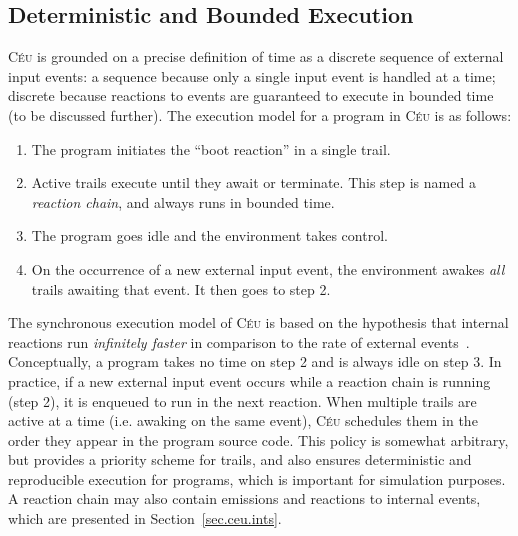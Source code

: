 \documentclass[letterpaper]{sig-alternate}
\newcommand{\CEU}{\textsc{C\'{e}u}\xspace}
\begin{document}
\subsection{Deterministic and Bounded Execution}
\label{sec.ceu.det}


\CEU is grounded on a precise definition of time as a discrete sequence of 
external input events:
a sequence because only a single input event is handled at a time; discrete 
because reactions to events are guaranteed to execute in bounded time (to be 
discussed further).
The execution model for a program in \CEU is as follows:

\begin{enumerate}
\item The program initiates the ``boot reaction'' in a single trail.
\item Active trails execute until they await or terminate.
      This step is named a \emph{reaction chain}, and always runs in bounded 
      time.
\item The program goes idle and the environment takes control.
\item On the occurrence of a new external input event, the environment awakes 
      \emph{all} trails awaiting that event.
      It then goes to step 2.
\end{enumerate}

The synchronous execution model of \CEU is based on the hypothesis that 
internal reactions run \emph{infinitely faster} in comparison to the rate of 
external events~\cite{rp.hypothesis}.
Conceptually, a program takes no time on step 2 and is always idle on step 3.
In practice, if a new external input event occurs while a reaction chain is 
running (step 2), it is enqueued to run in the next reaction.
%
%
When multiple trails are active at a time (i.e. awaking on the same event), 
\CEU schedules them in the order they appear in the program source code.
This policy is somewhat arbitrary, but provides a priority scheme for trails, 
and also ensures deterministic and reproducible execution for programs, which 
is important for simulation purposes.
A reaction chain may also contain emissions and reactions to internal events, 
which are presented in Section~\ref{sec.ceu.ints}.
\end{document}
